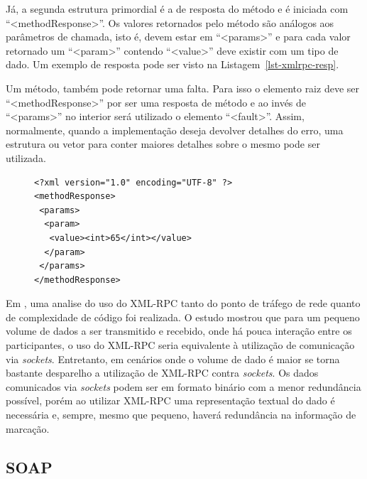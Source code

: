 Já, a segunda estrutura primordial é a de resposta do método e é iniciada
com ``<methodResponse>''. Os valores retornados pelo método são análogos aos
parâmetros de chamada, isto é, devem estar em ``<params>'' e para cada valor
retornado um ``<param>'' contendo ``<value>'' deve existir com um tipo de dado.
Um exemplo de resposta pode ser visto na Listagem~\ref{lst-xmlrpc-resp}.

Um método, também pode retornar uma falta.
Para isso o elemento raiz deve ser ``<methodResponse>'' por ser uma resposta
de método e ao invés de ``<params>'' no interior será utilizado o elemento
``<fault>''. Assim, normalmente, quando a implementação deseja devolver
detalhes do erro, uma estrutura ou vetor para conter maiores detalhes sobre o
mesmo pode ser utilizada.

\lstset{linewidth=85mm}
\begin{figure}
    \begin{minipage}{85mm}
	\begin{lstlisting}[frame=trbl, caption=Exemplo de resposta XML-RPC com os cabeçalhos HTTP sendo omitidos \cite{cerami2002web}., label=lst-xmlrpc-resp]
<?xml version="1.0" encoding="UTF-8" ?>
<methodResponse>
 <params>
  <param>
   <value><int>65</int></value>
  </param>
 </params>
</methodResponse>
	\end{lstlisting}
	\end{minipage}
\end{figure}

Em \cite{allman2003evaluation}, uma analise do uso do XML-RPC tanto do
ponto de tráfego de rede quanto de complexidade de código foi realizada.
O estudo mostrou que para um pequeno volume de dados a ser transmitido e
recebido, onde há pouca interação entre os participantes, o uso do XML-RPC
seria equivalente à utilização de comunicação via \emph{sockets}. Entretanto,
em cenários onde o volume de dado é maior se torna bastante desparelho a
utilização de XML-RPC contra \emph{sockets}. Os dados comunicados via
\emph{sockets} podem ser em formato binário com a menor redundância possível,
porém ao utilizar XML-RPC uma representação textual do dado é necessária e,
sempre, mesmo que pequeno, haverá redundância na informação de marcação.

\subsection{SOAP} \label{sec-protocolo-soap}

